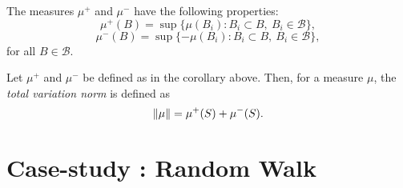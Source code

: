 The measures \( \mu^+ \) and \( \mu^- \) have the following properties:
\[
\mu^+(B) = \sup\{ \mu(B_i) : B_i \subset B,\ B_i \in \mathcal{B} \},
\]
\[
\mu^-(B) = \sup\{ -\mu(B_i) : B_i \subset B,\ B_i \in \mathcal{B} \},
\]
for all \( B \in \mathcal{B} \).

\begin{definition} \label{def:signed_meas}
  Let $\mu^+$ and $\mu^-$ be defined as in the corollary above. Then, for a measure \( \mu \), the \emph{total variation norm} is defined as
   \[\left\lVert \mu \right\rVert = \mu^{+}(S) + \mu^{-}(S).\] 
\end{definition}

\begin{comment}
  \begin{definition} \cite{tsybakov2008}
    Let  let $P$ and $Q$ be two probability measures on $\mathcal{M}\mathbb{R}$. Define
    $$
      \nu = P + Q, \quad p = \frac{dP}{d\nu}, \quad q = \frac{dQ}{d\nu},
    $$
    where $\frac{dP}{d\nu}$ denotes the  the Radon–Nikodym derivative of the measure $P$ with respect to the measure $\nu$. It holds that:
    \begin{align*}
      \norm{P-Q} = \sup_{A \in  \mathcal{B}} \left\{ \left\vert \int_{A} (p - q) \, d\nu \right\vert \right\}.
    \end{align*}
     \end{definition}
\end{comment}

 

  
\section{Case-study : Random Walk}

 

